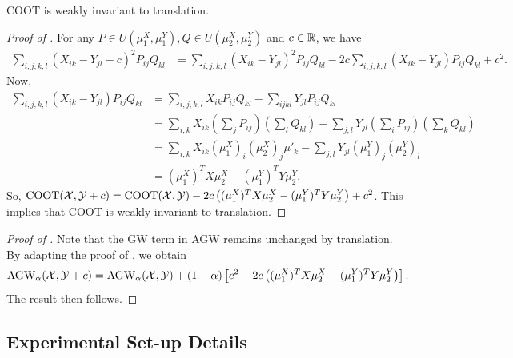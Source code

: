 \begin{lemma}
\label{prop:coot_invariant}
    COOT is weakly invariant to translation.
\end{lemma}
\begin{proof}[Proof of ]
For any $P \in U(\mu_1^X, \mu_1^Y), Q \in U(\mu_2^X, \mu_2^Y)$ and $c \in \mathbb R$, we have
\begin{align}
    \sum_{i,j,k,l} (X_{ik} - Y_{jl} - c)^2 P_{ij} Q_{kl}
    &= \sum_{i,j,k,l} (X_{ik} - Y_{jl})^2 P_{ij} Q_{kl}
    - 2c \sum_{i,j,k,l} (X_{ik} - Y_{jl}) P_{ij} Q_{kl} + c^2.
\end{align}
Now,
\begin{align}
    \sum_{i,j,k,l} (X_{ik} - Y_{jl}) P_{ij} Q_{kl}
    &= \sum_{i,j,k,l} X_{ik} P_{ij} Q_{kl} - \sum_{ijkl} Y_{jl} P_{ij} Q_{kl} \\
    &= \sum_{i,k} X_{ik} \left( \sum_j P_{ij} \right) \left( \sum_l Q_{kl} \right)
    - \sum_{j,l} Y_{jl} \left( \sum_i P_{ij} \right) \left( \sum_k Q_{kl} \right) \\
    &= \sum_{i,k} X_{ik} (\mu_1^X)_i (\mu_2^X)_j \mu'_k - \sum_{j,l} Y_{jl} (\mu_1^Y)_j (\mu_2^Y)_l \\
    &= (\mu_1^X)^T X \mu_2^X - (\mu_1^Y)^T Y \mu_2^Y.
\end{align}
So, $\text{COOT}(\mathcal X, \mathcal Y + c) = \text{COOT}(\mathcal X, \mathcal Y) -
2 c \left( (\mu_1^X)^T X \mu_2^X - (\mu_1^Y)^T Y \mu_2^Y \right) + c^2$.
This implies that COOT is weakly invariant to translation.
\end{proof}

\begin{proof}[Proof of ]
Note that the GW term in AGW remains unchanged by translation.
By adapting the proof of , we obtain
\begin{align}
    \text{AGW}_{\alpha}(\mathcal X, \mathcal Y + c) = \text{AGW}_{\alpha}(\mathcal X, \mathcal Y) + (1 - \alpha) \left[ c^2
    - 2 c \left( (\mu_1^X)^T X \mu_2^X - (\mu_1^Y)^T Y \mu_2^Y \right) \right].
\end{align}
The result then follows.
\end{proof}

\subsection{Experimental Set-up Details} \label{subsec:appendix_expe_agw}

